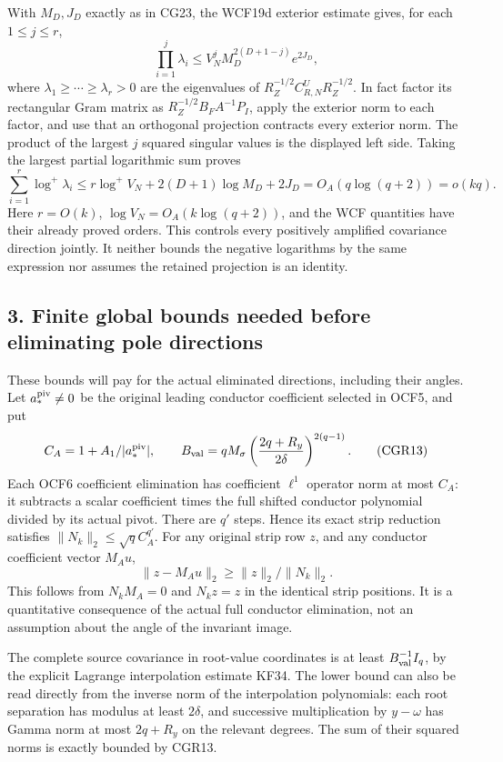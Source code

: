 With \(M_D,J_D\) exactly as in CG23, the WCF19d exterior estimate gives, for each \(1\le j\le r\), \[
\prod_{i=1}^j\lambda_i
\le V_N^j M_D^{2(D+1-j)}e^{2J_D},
\tag{CGR11}
\] where \(\lambda_1\ge\cdots\ge\lambda_r>0\) are the eigenvalues of \(R_Z^{-1/2}C_{R,N}^UR_Z^{-1/2}\). In fact factor its rectangular Gram matrix as \(R_Z^{-1/2}B_FA^{-1}P_I\), apply the exterior norm to each factor, and use that an orthogonal projection contracts every exterior norm. The product of the largest \(j\) squared singular values is the displayed left side. Taking the largest partial logarithmic sum proves \[
\boxed{\sum_{i=1}^r\log^+\lambda_i
\le r\log^+V_N+2(D+1)\log M_D+2J_D
=O_A(q\log(q+2))=o(kq).}
\tag{CGR12}
\] Here \(r=O(k)\), \(\log V_N=O_A(k\log(q+2))\), and the WCF quantities have their already proved orders. This controls every positively amplified covariance direction jointly. It neither bounds the negative logarithms by the same expression nor assumes the retained projection is an identity.

\subsection{3. Finite global bounds needed before eliminating pole directions}\label{finite-global-bounds-needed-before-eliminating-pole-directions}

These bounds will pay for the actual eliminated directions, including their angles. Let \(a_*^{\rm piv}\ne0\) be the original leading conductor coefficient selected in OCF5, and put \[
C_A=1+A_1/|a_*^{\rm piv}|,\qquad
B_{\rm val}=qM_\sigma
\left(\frac{2q+R_y}{2\delta}\right)^{2(q-1)}.
\tag{CGR13}
\] Each OCF6 coefficient elimination has coefficient \(\ell^1\) operator norm at most \(C_A\): it subtracts a scalar coefficient times the full shifted conductor polynomial divided by its actual pivot. There are \(q'\) steps. Hence its exact strip reduction satisfies \(\|N_k\|_2\le\sqrt q C_A^{q'}\). For any original strip row \(z\), and any conductor coefficient vector \(M_Au\), \[
\|z-M_Au\|_2\ge\|z\|_2/\|N_k\|_2.
\tag{CGR14}
\] This follows from \(N_kM_A=0\) and \(N_kz=z\) in the identical strip positions. It is a quantitative consequence of the actual full conductor elimination, not an assumption about the angle of the invariant image.

The complete source covariance in root-value coordinates is at least \(B_{\rm val}^{-1}I_q\), by the explicit Lagrange interpolation estimate KF34. The lower bound can also be read directly from the inverse norm of the interpolation polynomials: each root separation has modulus at least \(2\delta\), and successive multiplication by \(y-\omega\) has Gamma norm at most \(2q+R_y\) on the relevant degrees. The sum of their squared norms is exactly bounded by CGR13.

